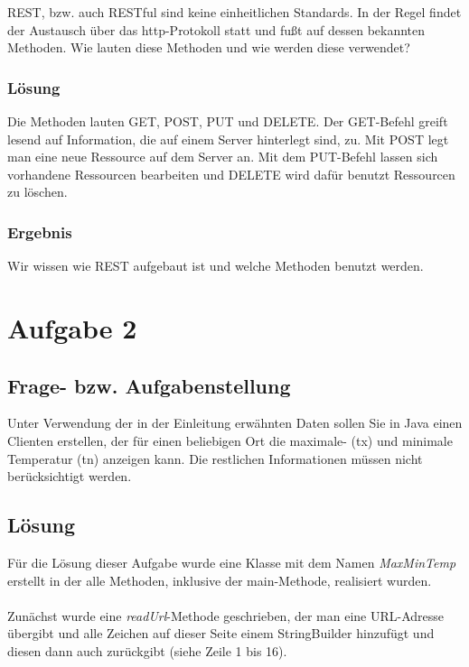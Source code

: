 REST, bzw. auch RESTful sind keine einheitlichen Standards. In der Regel findet der Austausch über das http-Protokoll statt und fußt auf dessen bekannten Methoden. Wie lauten diese Methoden und wie werden diese verwendet?

\subsubsection{Lösung}

Die Methoden lauten GET, POST, PUT und DELETE. Der GET-Befehl greift lesend auf Information, die auf einem Server hinterlegt sind, zu. Mit POST legt man eine neue Ressource auf dem Server an. Mit dem PUT-Befehl lassen sich vorhandene Ressourcen bearbeiten und DELETE wird dafür benutzt Ressourcen zu löschen. \cite{[3]}

\subsubsection{Ergebnis}

Wir wissen wie REST aufgebaut ist und welche Methoden benutzt werden.

\section{Aufgabe 2}\cite{[4]}

\subsection{Frage- bzw. Aufgabenstellung}

Unter Verwendung der in der Einleitung erwähnten Daten sollen Sie in Java einen Clienten erstellen, der für einen beliebigen Ort die maximale- (tx) und minimale Temperatur (tn) anzeigen kann. Die restlichen Informationen müssen nicht berücksichtigt werden.

\subsection{Lösung}

Für die Lösung dieser Aufgabe wurde eine Klasse mit dem Namen \textit{MaxMinTemp} erstellt in der alle Methoden, inklusive der main-Methode, realisiert wurden. \\
\\
Zunächst wurde eine \textit{readUrl}-Methode geschrieben, der man eine URL-Adresse übergibt und alle Zeichen auf dieser Seite einem StringBuilder hinzufügt und diesen dann auch zurückgibt (siehe Zeile 1 bis 16).


